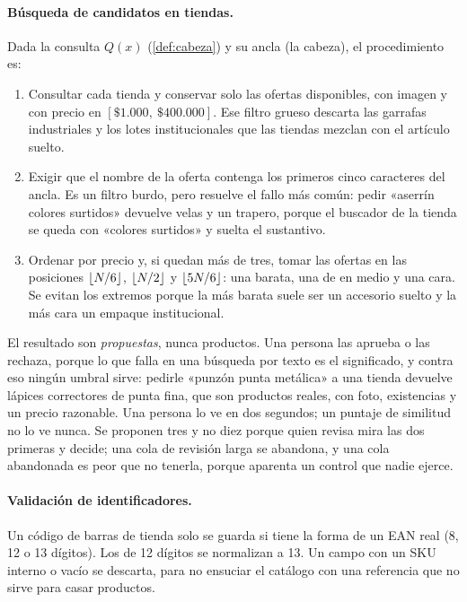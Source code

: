 \paragraph{Búsqueda de candidatos en tiendas.} Dada la consulta $Q(x)$
(\cref{def:cabeza}) y su ancla (la cabeza), el procedimiento es:
\begin{enumerate}
  \item Consultar cada tienda y conservar solo las ofertas disponibles, con
        imagen y con precio en $[\$1.000,\ \$400.000]$. Ese filtro grueso
        descarta las garrafas industriales y los lotes institucionales que
        las tiendas mezclan con el artículo suelto.
  \item Exigir que el nombre de la oferta contenga los primeros cinco
        caracteres del ancla. Es un filtro burdo, pero resuelve el fallo más
        común: pedir «aserrín colores surtidos» devuelve velas y un trapero,
        porque el buscador de la tienda se queda con «colores surtidos» y
        suelta el sustantivo.
  \item Ordenar por precio y, si quedan más de tres, tomar las ofertas en las
        posiciones $\left\lfloor N/6 \right\rfloor$, $\left\lfloor N/2 \right\rfloor$ y $\left\lfloor 5N/6 \right\rfloor$: una barata, una
        de en medio y una cara. Se evitan los extremos porque la más barata
        suele ser un accesorio suelto y la más cara un empaque institucional.
\end{enumerate}
El resultado son \emph{propuestas}, nunca productos. Una persona las aprueba o
las rechaza, porque lo que falla en una búsqueda por texto es el significado,
y contra eso ningún umbral sirve: pedirle «punzón punta metálica» a una tienda
devuelve lápices correctores de punta fina, que son productos reales, con
foto, existencias y un precio razonable. Una persona lo ve en dos segundos; un
puntaje de similitud no lo ve nunca. Se proponen tres y no diez porque quien
revisa mira las dos primeras y decide; una cola de revisión larga se abandona,
y una cola abandonada es peor que no tenerla, porque aparenta un control que
nadie ejerce.

\paragraph{Validación de identificadores.} Un código de barras de tienda solo
se guarda si tiene la forma de un EAN real (8, 12 o 13 dígitos). Los de 12
dígitos se normalizan a 13. Un campo con un SKU interno o vacío se descarta,
para no ensuciar el catálogo con una referencia que no sirve para casar
productos.

